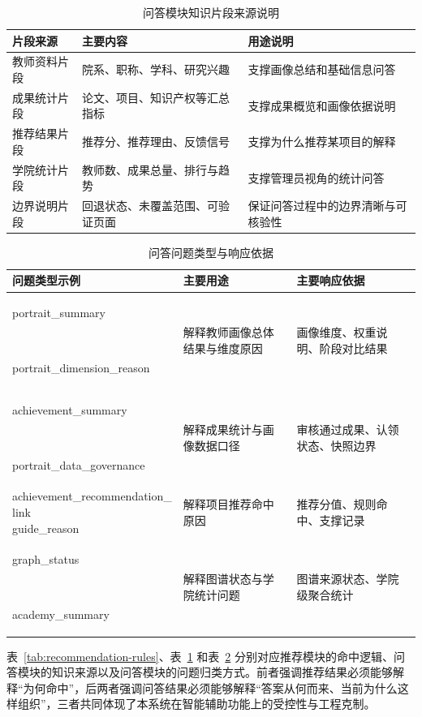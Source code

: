 \documentclass[12pt,a4paper]{ctexbook}
\newcommand{\codecell}[1]{\parbox[t]{\hsize}{\raggedright\scriptsize\ttfamily #1}}
\begin{document}
\begin{table}[H]
  \centering
  \caption{问答模块知识片段来源说明}
  \label{tab:assistant-knowledge}
  \begin{tabular}{p{3cm}p{3cm}p{5.3cm}}
    \toprule
    片段来源 & 主要内容 & 用途说明 \\
    \midrule
    教师资料片段 & 院系、职称、学科、研究兴趣 & 支撑画像总结和基础信息问答 \\
    成果统计片段 & 论文、项目、知识产权等汇总指标 & 支撑成果概览和画像依据说明 \\
    推荐结果片段 & 推荐分、推荐理由、反馈信号 & 支撑为什么推荐某项目的解释 \\
    学院统计片段 & 教师数、成果总量、排行与趋势 & 支撑管理员视角的统计问答 \\
    边界说明片段 & 回退状态、未覆盖范围、可验证页面 & 保证问答过程中的边界清晰与可核验性 \\
    \bottomrule
  \end{tabular}
\end{table}

\begin{table}[H]
  \centering
  \small
  \caption{问答问题类型与响应依据}
  \label{tab:assistant-question-types}
  \begin{tabular}{p{3.8cm}p{4cm}p{3.8cm}}
    \toprule
    问题类型示例 & 主要用途 & 主要响应依据 \\
    \midrule
    \makecell[l]{\codecell{portrait\_summary}\\\codecell{portrait\_dimension\_reason}} & 解释教师画像总体结果与维度原因 & 画像维度、权重说明、阶段对比结果 \\
    \makecell[l]{\codecell{achievement\_summary}\\\codecell{portrait\_data\_governance}} & 解释成果统计与画像数据口径 & 审核通过成果、认领状态、快照边界 \\
    \makecell[l]{\scriptsize\ttfamily achievement\_recommendation\_\\link\\guide\_reason} & 解释项目推荐命中原因 & 推荐分值、规则命中、支撑记录 \\
    \makecell[l]{\codecell{graph\_status}\\\codecell{academy\_summary}} & 解释图谱状态与学院统计问题 & 图谱来源状态、学院级聚合统计 \\
    \bottomrule
  \end{tabular}
\end{table}

表~\ref{tab:recommendation-rules}、表~\ref{tab:assistant-knowledge} 和表~\ref{tab:assistant-question-types} 分别对应推荐模块的命中逻辑、问答模块的知识来源以及问答模块的问题归类方式。前者强调推荐结果必须能够解释“为何命中”，后两者强调问答结果必须能够解释“答案从何而来、当前为什么这样组织”，三者共同体现了本系统在智能辅助功能上的受控性与工程克制。
\end{document}

